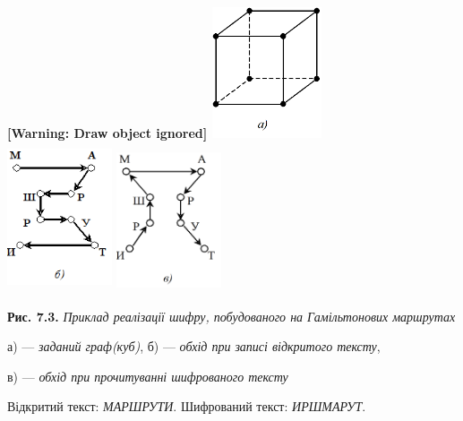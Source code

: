 \bigskip

{\centering\bfseries
[Warning: Draw object ignored]
\includegraphics[width=1.2811in,height=1.5209in]{crypt-img/crypt-img69.png}
\ \ \ \ 
\includegraphics[width=1.2189in,height=1.7335in]{crypt-img/crypt-img70.png} 
\includegraphics[width=1.2189in,height=1.6665in]{crypt-img/crypt-img71.png} 
\par}


\bigskip

{\centering
\textbf{Рис. 7.3. }\textit{Приклад реалізації шифру, побудованого на
Гамільтонових маршрутах}
\par}

{\centering
а) --- \textit{заданий граф(куб)}, б) --- \textit{обхід при записі відкритого
тексту}, 
\par}

{\centering
в) --- \textit{обхід при прочитуванні шифрованого тексту}
\par}

{\centering
Відкритий текст: \textit{МАРШРУТИ}. Шифрований текст: \textit{ИРШМАРУТ}.
\par}


\bigskip

